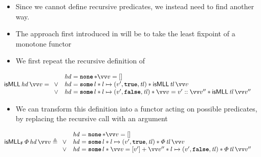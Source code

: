 \documentclass[thesis.tex]{subfiles}
\begin{document}
\begin{itemize}
    \item Since we cannot define recursive predicates, we instead need to find another way.
    \item The approach first introduced in \cite{?} will be to take the least fixpoint of a monotone functor
    \item We first repeat the recursive definition of \isMLL
\end{itemize}
\begin{align*}
    \isMLL\, \langv{hd}\, \vect{\val} & =
    \begin{array}{cl}
             & \langv{hd} = \None * \vect{\val} = []                                                                                                      \\
        \lor & \langv{hd} = \Some l * l \fmapsto (\val', \True, \langv{tl}) * \isMLL\, \langv{tl}\, \vect{\val}                                           \\
        \lor & \langv{hd} = \Some l * l \fmapsto (\val', \False, \langv{tl}) * \vect{\val} = \val' :: \vect{\val}'' * \isMLL\, \langv{tl}\, \vect{\val}''
    \end{array}
\end{align*}
\begin{itemize}
    \item We can transform this definition into a functor acting on possible \isMLL predicates, by replacing the recursive call with an argument 
\end{itemize}
\begin{align*}
    \isMLL_\hopred\, \pred\, \langv{hd}\, \vect{v} & \eqdef
    \begin{array}{rl}
             & \langv{hd} = \None * \vect{v} = []                                                                                                         \\
        \lor & \langv{hd} = \Some l * l \fmapsto (\val', \True, \langv{tl}) * \pred\, \langv{tl}\, \vect{v}                                               \\
        \lor & \langv{hd} = \Some l * \vect{\val} = [\val'] + \vect{\val}'' * l \fmapsto (\val', \False, \langv{tl}) * \pred\, \langv{tl}\, \vect{\val}''
    \end{array}
\end{align*}
\end{document}
